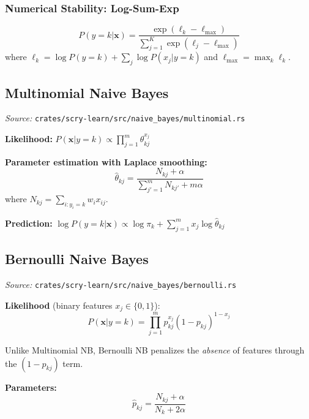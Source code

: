 \documentclass[11pt,a4paper]{article}
\theoremstyle{definition}
\theoremstyle{remark}
\begin{document}
\subsubsection*{Numerical Stability: Log-Sum-Exp}
\begin{equation}
P(y=k|\mathbf{x}) = \frac{\exp(\ell_k - \ell_{\max})}{\sum_{j=1}^K \exp(\ell_j - \ell_{\max})}
\end{equation}
where $\ell_k = \log P(y=k) + \sum_j \log P(x_j|y=k)$ and $\ell_{\max} = \max_k \ell_k$.

\subsection{Multinomial Naive Bayes}

\noindent\textit{Source:} \texttt{crates/scry-learn/src/naive\_bayes/multinomial.rs}

\textbf{Likelihood:} $P(\mathbf{x}|y=k) \propto \prod_{j=1}^m \theta_{kj}^{x_j}$

\textbf{Parameter estimation with Laplace smoothing:}
\begin{equation}
\hat{\theta}_{kj} = \frac{N_{kj} + \alpha}{\sum_{j'=1}^m N_{kj'} + m\alpha}
\end{equation}
where $N_{kj} = \sum_{i: y_i=k} w_i x_{ij}$.

\textbf{Prediction:} $\log P(y=k|\mathbf{x}) \propto \log\pi_k + \sum_{j=1}^m x_j\log\hat{\theta}_{kj}$

\subsection{Bernoulli Naive Bayes}

\noindent\textit{Source:} \texttt{crates/scry-learn/src/naive\_bayes/bernoulli.rs}

\textbf{Likelihood} (binary features $x_j \in \{0,1\}$):
\begin{equation}
P(\mathbf{x}|y=k) = \prod_{j=1}^m p_{kj}^{x_j}(1-p_{kj})^{1-x_j}
\end{equation}

Unlike Multinomial NB, Bernoulli NB penalizes the \emph{absence} of features through the $(1-p_{kj})$ term.

\textbf{Parameters:}
\begin{equation}
\hat{p}_{kj} = \frac{N_{kj} + \alpha}{N_k + 2\alpha}
\end{equation}
\end{document}
